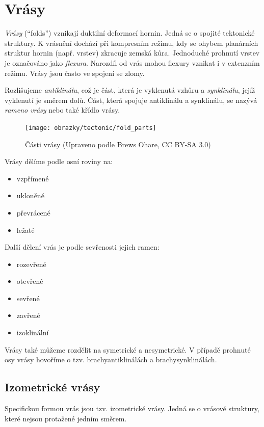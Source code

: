 \section{Vrásy}
\emph{Vrásy} (\enquote{folds}) vznikají duktilní deformací hornin. Jedná se o spojité tektonické struktury. K vrásnění dochází při kompresním režimu, kdy se ohybem planárních struktur hornin (např. vrstev) zkracuje zemská kůra. Jednoduché prohnutí vrstev je označováno jako \emph{flexura}. Narozdíl od vrás mohou flexury vznikat i v extenzním režimu. Vrásy jsou často ve spojení se zlomy.

Rozlišujeme \emph{antiklinálu}, což je část, která je vyklenutá vzhůru a \emph{synklinálu}, jejíž vyklenutí je směrem dolů. Část, která spojuje antiklinálu a synklinálu, se nazývá \emph{rameno vrásy} nebo také křídlo vrásy.

\begin{figure}[h]
	\centering
	\texttt{[image: obrazky/tectonic/fold\_parts]}
	\caption{Části vrásy (Upraveno podle Brews Ohare, CC BY-SA 3.0)}
	\label{fig:foldparts}
\end{figure}

Vrásy dělíme podle osní roviny na:

\begin{itemize}
	\item vzpřímené
	\item ukloněné
	\item převrácené
	\item ležaté
\end{itemize}

Další dělení vrás je podle sevřenosti jejich ramen:
\begin{itemize}
	\item rozevřené
	\item otevřené
	\item sevřené
	\item zavřené
	\item izoklinální
\end{itemize}

Vrásy také můžeme rozdělit na symetrické a nesymetrické. V případě prohnuté osy vrásy hovoříme o tzv. brachyantiklinálách a brachysynklinálách.

\subsection{Izometrické vrásy}
Specifickou formou vrás jsou tzv. izometrické vrásy. Jedná se o vrásové struktury, které nejsou protažené jedním směrem. 

